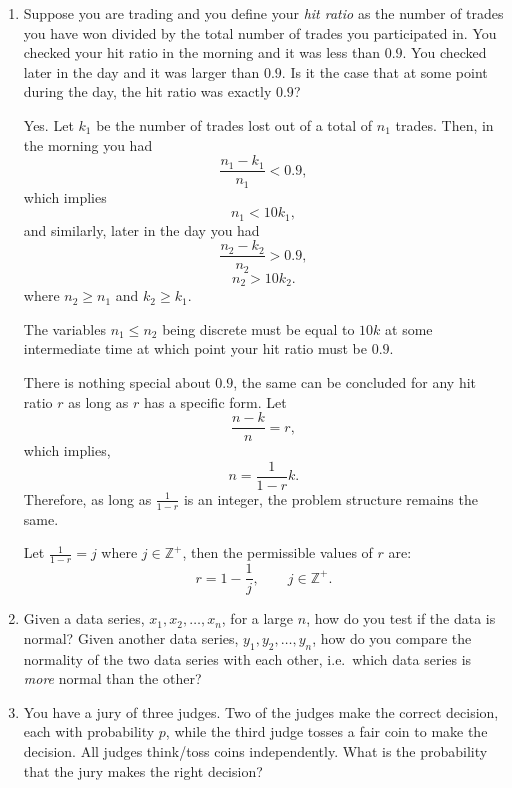 \documentclass{amsart}
\theoremstyle{plain}
\numberwithin{equation}{section}
\begin{document}
\begin{enumerate}
Therefore, the range of correlation between 
$X$ and $Z$ must satisfy

\begin{align*}
\cos\left(2\alpha\right) &\leq \rho_{XZ} \leq \cos\left( 0 \right),\\
\implies \cos\left(2 \cos^{-1} \left(\rho\right) \right) & \leq \rho_{XZ} \leq 1.
\end{align*}

\item Suppose you are trading and you define 
your \emph{hit ratio} as the number of trades you have 
won divided by the total number of trades you 
participated in.
You checked your hit ratio in the morning 
and it was less than $0.9$. You checked later
in the day and it was larger than $0.9$. Is it the 
case that at some point during the day, the hit 
ratio was exactly $0.9$?

Yes. Let $k_1$ be the number of trades lost out of a total of $n_1$
trades. Then, in the morning you had
$$ \frac{n_1-k_1}{n_1} < 0.9,$$
which implies 
$$n_1 < 10k_1,$$ 
and similarly, later in the day you had
$$ \frac{n_2-k_2}{n_2} > 0.9,$$
$$n_2 > 10k_2.$$ 
where $n_2 \geq n_1$ and $k_2\geq k_1$.


The variables $n_1 \leq n_2$ being discrete must be equal 
to $10k$ at some intermediate time at which point 
your hit ratio must be $0.9$.

There is nothing special about $0.9$, the same can 
be concluded for any hit ratio $r$ as long as $r$ has a 
specific form. Let
$$\frac{n-k}{n} = r,$$ which 
implies,
$$ n = \frac{1}{1-r} k.$$
Therefore, as long as $\frac{1}{1-r}$ is an integer,
the problem structure remains the same. 

Let $\frac{1}{1-r} = j$ where $j \in \mathbb{Z^+}$, then
the permissible values of $r$ are:
$$r  = 1 - \frac{1}{j}, \qquad j \in \mathbb{Z^+}.$$

\item Given a data series, $x_1, x_2, \ldots, x_n$, for 
a large $n$, how do you test if the data is normal? Given 
another data series, $y_1, y_2, \ldots, y_n$, how do you 
compare the normality of the two data series with each other, 
i.e.\ which data series is \emph{more} normal than the other?

\item You have a jury of three judges. Two of the judges
make the correct decision, each with probability $p$, while
the third judge tosses a fair coin to make the decision. 
All judges think/toss coins independently. What is the 
probability that the jury makes the right decision?


\end{enumerate}
\end{document}
